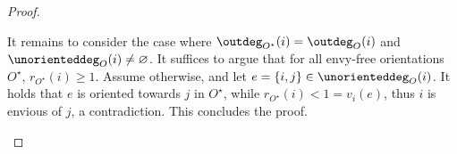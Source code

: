 \documentclass[11pt,letterpaper]{article}
\begin{document}
\begin{proof}
\begin{nestedproof}
        It remains to consider the case where $\outdeg_{O^\star}(i) = \outdeg_O(i)$ and $\unorienteddeg_O(i) \neq \varnothing$.
        It suffices to argue that for all envy-free orientations $O^\star$, $r_{O^\star}(i) \ge 1$.
            Assume otherwise, and let $e = \{ i, j \} \in \unorienteddeg_O(i)$.
        It holds that $e$ is oriented towards $j$ in $O^\star$, while $r_{O^\star}(i) < 1 = v_i(e)$,
        thus $i$ is envious of $j$, a contradiction.
        This concludes the proof.
%
%

\end{nestedproof}
\end{proof}
\end{document}
